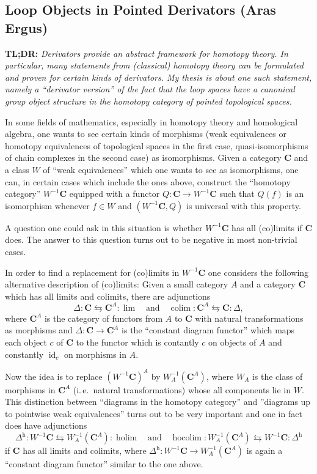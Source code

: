 \subsection{Loop Objects in Pointed Derivators (Aras Ergus)}

\textbf{TL;DR:} \emph{Derivators provide an abstract framework for homotopy
theory. In particular, many statements from (classical) homotopy theory
can be formulated and proven for certain kinds of derivators. My thesis
is about one such statement, namely a ``derivator version'' of the fact that
the loop spaces have a canonical group object structure in the homotopy
category of pointed topological spaces.}

In some fields of mathematics, especially in homotopy theory and
homological algebra, one wants to see certain kinds of morphisms
(weak equivalences or homotopy equivalences of topological spaces
in the first case, quasi-isomorphisms of chain complexes in the second
case) as isomorphisms. Given a category $\mathbf{C}$ and a class $W$
of ``weak equivalences'' which one wants to see as isomorphisms,
one can, in certain cases which include the ones above, construct the
``homotopy category'' $W^{-1}\mathbf{C}$ equipped with a functor
$Q \colon \mathbf{C} \to W^{-1}\mathbf{C}$ such that $Q(f)$ is
an isomorphism whenever $f \in W$ and $(W^{-1}\mathbf{C}, Q)$ is
universal with this property.

A question one could ask in this situation is whether $W^{-1}\mathbf{C}$
has all (co)limits if $\mathbf{C}$ does. The answer to this
question turns out to be negative in most non-trivial cases.

In order to find a replacement for (co)limits in $W^{-1}\mathbf{C}$
one considers the following alternative description of (co)limits:
Given a small category $A$ and a category $\mathbf{C}$ which has all limits
and colimits, there are adjunctions
\[
\Delta \colon \mathbf{C} \leftrightarrows \mathbf{C}^A \colon \lim
\quad \text{and} \quad
\operatorname{colim} \colon \mathbf{C}^A \leftrightarrows
\mathbf{C} \colon \Delta,
\]
where $\mathbf{C}^A$ is the category of functors from $A$ to $\mathbf{C}$
with natural transformations as morphisms and
$\Delta \colon \mathbf{C} \to \mathbf{C}^A$ is the ``constant diagram
functor'' which maps each object $c$ of $\mathbf{C}$ to the functor which is
contantly $c$ on objects of $A$ and constantly $\operatorname{id}_c$ on
morphisms in $A$.

Now the idea is to replace $(W^{-1}\mathbf{C})^A$ by
$W_A^{-1}(\mathbf{C}^A)$, where $W_A$ is the class of morphisms in
$\mathbf{C}^A$ (i.\,e.\ natural transformations) whose all components lie in
$W$. This distinction between ``diagrams in the homotopy category'' and
''diagrams up to pointwise weak equivalences'' turns out to be very important
and one in fact does have adjunctions
\[
\Delta^{\mathrm{h}} \colon W^{-1}\mathbf{C} \leftrightarrows
W_A^{-1}(\mathbf{C}^A) \colon \operatorname{holim}
\quad \text{and} \quad
\operatorname{hocolim} \colon W_A^{-1}(\mathbf{C}^A) \leftrightarrows
W^{-1}\mathbf{C} \colon \Delta^{\mathrm{h}}
\]
if $\mathbf{C}$ has all limits and colimits, where
$\Delta^{\mathrm{h}} \colon W^{-1}\mathbf{C} \to W_A^{-1}(\mathbf{C}^A)$ is
again a ``constant diagram functor'' similar to the one above.

